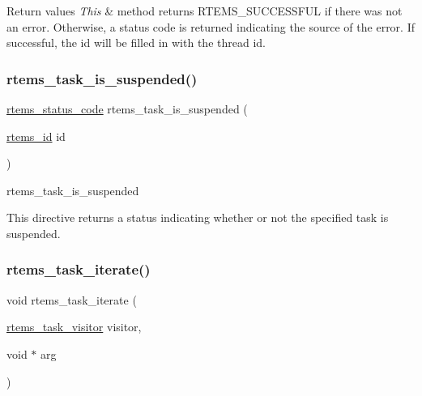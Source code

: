 \begin{DoxyRetVals}{Return values}
{\em This} & method returns R\+T\+E\+M\+S\+\_\+\+S\+U\+C\+C\+E\+S\+S\+F\+UL if there was not an error. Otherwise, a status code is returned indicating the source of the error. If successful, the id will be filled in with the thread id. \\
\hline
\end{DoxyRetVals}
\mbox{\label{group__ClassicTasks_ga626e860edc5525db9f87de63efe14661}} 
\subsubsection{\texorpdfstring{rtems\_task\_is\_suspended()}{rtems\_task\_is\_suspended()}}
{\footnotesize\ttfamily \mbox{\hyperlink{group__ClassicStatus_ga545d41846817eaba6143d52ee4d9e9fe}{rtems\+\_\+status\+\_\+code}} rtems\+\_\+task\+\_\+is\+\_\+suspended (\begin{DoxyParamCaption}\item[{\mbox{\hyperlink{group__ClassicTasks_gab20892b814dced7dd4e5b9bf42becd57}{rtems\+\_\+id}}}]{id }\end{DoxyParamCaption})}



rtems\+\_\+task\+\_\+is\+\_\+suspended 

This directive returns a status indicating whether or not the specified task is suspended. \mbox{\label{group__ClassicTasks_ga7255f41eb20238aebe5ce139d5dfd97d}} 
\subsubsection{\texorpdfstring{rtems\_task\_iterate()}{rtems\_task\_iterate()}}
{\footnotesize\ttfamily void rtems\+\_\+task\+\_\+iterate (\begin{DoxyParamCaption}\item[{\mbox{\hyperlink{group__ClassicTasks_ga861b5d2aa73bff68304c15cbb2b9c688}{rtems\+\_\+task\+\_\+visitor}}}]{visitor,  }\item[{void $\ast$}]{arg }\end{DoxyParamCaption})}



